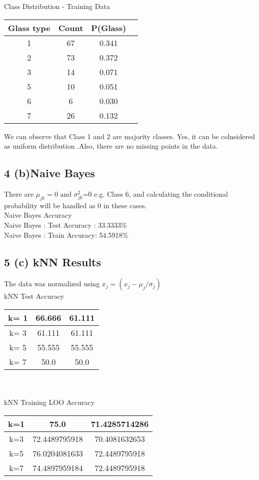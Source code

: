 \documentclass[10pt,letterpaper]{article}
\begin{document}
\begin{center}
Class Distribution - Training Data\\
\begin{tabular}{c|c|c|c}
\hline Glass type & Count & P(Glass)\\
\hline 1 & 67 & 0.341\\
\hline 2 & 73 & 0.372\\
\hline 3 & 14 & 0.071\\
\hline 5 & 10 & 0.051\\
\hline 6 & 6 & 0.030\\
\hline 7 & 26 & 0.132\\
\end{tabular}
\end{center}
We can observe that Class 1 and 2 are majority classes. Yes, it can be colnsidered as uniform distribution .Also, there are no missing points in the data.
\subsection{4 (b)Naive Bayes}
There are $\mu_{jk}=0 \text{ and }  \sigma_{jk}^2$=0 e.g. Class 6, and calculating the conditional probability will be handled as 0 in these cases. \\

Naive Bayes Accuracy\\
Naive Bayes : Test Accuracy : 33.3333\%\\
Naive Bayes : Train Accuracy: 54.5918\%\\
\subsection{5 (c) kNN Results}
The data was normalized using $x_j= (x_j-\mu_{j}/\sigma_{j})$\\
kNN Test Accuracy \\

\begin{tabular}{c|c|c}
\hline k= 1  &  66.666 &  61.111\\
\hline k= 3  &  61.111 &  61.111\\
\hline k= 5  &  55.555  &  55.555\\
\hline k= 7  &  50.0  &  50.0\\
\end{tabular}\\
\\
\newpage
kNN Training LOO Accuracy \\
\begin{tabular}{c|c|c}
\hline k=1 &  75.0  &  71.4285714286\\
\hline k=3 &  72.4489795918  &  70.4081632653\\
\hline k=5 &  76.0204081633  &  72.4489795918\\
\hline k=7 &  74.4897959184  &  72.4489795918\\
\end{tabular}\\
\end{document}
